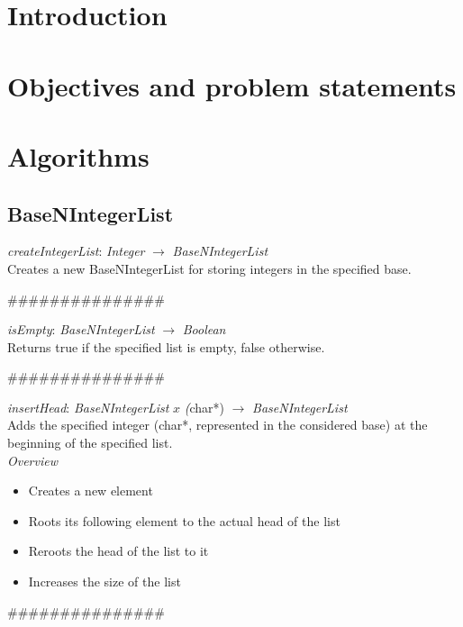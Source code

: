 \documentclass[backcover, english, report, nodocumentinfo]{upmethodology-document}
\newcommand{\nxtalgo}{\centerline{$$$$\#\#\#\#\#\#\#\#\#\#\#\#\#\#\#$$$$}}
\newcommand{\ov}{\emph{Overview}}
\begin{document}
\tableofcontents

\chapter{Introduction}
\chapter{Objectives and problem statements}
\chapter{Algorithms}
	\section{BaseNIntegerList}

		\begin{minipage}{\linewidth}
			\emph{createIntegerList}: \emph{Integer} \(\rightarrow\) \emph{BaseNIntegerList}\\
				Creates a new BaseNIntegerList for storing integers in the specified base.
			\label{algo:BNIL-CreateIntegerList}
			
		\end{minipage}
		\nxtalgo

		\begin{minipage}{\linewidth}
			\emph{isEmpty}: \emph{BaseNIntegerList} \(\rightarrow\) \emph{Boolean}\\
				Returns true if the specified list is empty, false otherwise.
			\label{algo:BNIL-IsEmpty}
			
		\end{minipage}
		\nxtalgo

		\begin{minipage}{\linewidth}
			\emph{insertHead}: \emph{BaseNIntegerList} \(x\) \emph(char*) \(\rightarrow\) \emph{BaseNIntegerList}\\
				Adds the specified integer (char*, represented in the considered base) at the beginning of the specified list.\\
			\ov
			\begin{itemize}
				\item Creates a new element
				\item Roots its following element to the actual head of the list
				\item Reroots the head of the list to it
				\item Increases the size of the list
			\end{itemize}
			\label{algo:BNIL-InsertHead}
			
		\end{minipage}
		\nxtalgo
\end{document}
